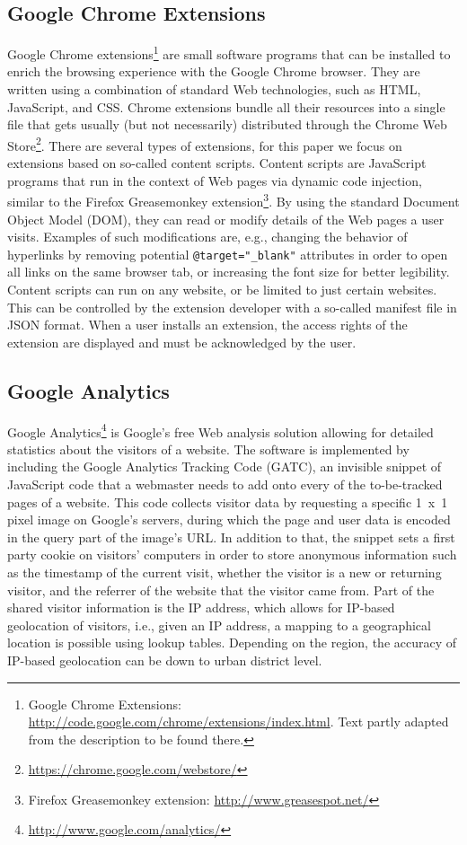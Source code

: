 \documentclass[runningheads,a4paper]{llncs}
\begin{document}
\subsection{Google Chrome Extensions}
Google Chrome extensions\footnote{Google Chrome Extensions: \url{http://code.google.com/chrome/extensions/index.html}. Text partly adapted from the description to be found there.} are small software programs that can be installed to enrich the browsing experience with the Google Chrome browser. They are written using a combination of standard Web technologies, such as HTML, JavaScript, and CSS. Chrome extensions bundle all their resources into a single file that gets usually (but not necessarily) distributed through the Chrome Web Store\footnote{\url{https://chrome.google.com/webstore/}}. There are several types of extensions, for this paper we focus on extensions based on so-called content scripts. Content scripts are JavaScript programs that run in the context of Web pages via dynamic code injection, similar to the Firefox Greasemonkey extension\footnote{Firefox Greasemonkey extension: \url{http://www.greasespot.net/}}. By using the standard Document Object Model (DOM), they can read or modify details of the Web pages a user visits. Examples of such modifications are, e.g., changing the behavior of hyperlinks by removing potential \texttt{@target="\_blank"} attributes in order to open all links on the same browser tab, or increasing the font size for better legibility. Content scripts can run on any website, or be limited to just certain websites. This can be controlled by the extension developer with a so-called manifest file in JSON format. When a user installs an extension, the access rights of the extension are displayed and must be acknowledged by the user.

\subsection{Google Analytics}
Google Analytics\footnote{\url{http://www.google.com/analytics/}} is Google's free Web analysis solution allowing for detailed statistics about the visitors of a website. The software is implemented by including the Google Analytics Tracking Code (GATC), an invisible snippet of JavaScript code that a webmaster needs to add onto every of the to-be-tracked pages of a website. This code collects visitor data by requesting a specific 1~x~1 pixel image on Google's servers, during which the page and user data is encoded in the query part of the image's URL. In addition to that, the snippet sets a first party cookie on visitors' computers in order to store anonymous information such as the timestamp of the current visit, whether the visitor is a new or returning visitor, and the referrer of the website that the visitor came from. Part of the shared visitor information is the IP address, which allows for IP-based geolocation of visitors, i.e., given an IP address, a mapping to a geographical location is possible using lookup tables. Depending on the region, the accuracy of IP-based geolocation can be down to urban district level.
 
\end{document}
